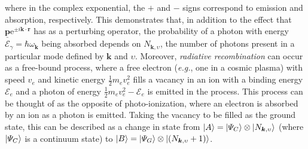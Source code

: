 where in the complex exponential, the $+$ and $-$ signs correspond to emission and absorption, respectively. 
This demonstrates that, in addition to the effect that $\underline{\mathbold{p}} \mathrm{e}^{\pm i \mathbold{k} \cdot \mathbold{r}}$ has as a perturbing operator, the probability of a photon with energy $\mathcal{E}_{\gamma} = \hbar \omega_{\mathbold{k}}$ being absorbed depends on $N_{\mathbold{k},\upsilon}$, the number of photons present in a particular mode defined by $\mathbold{k}$ and $\upsilon$. 
Moreover, \emph{radiative recombination} can occur as a free-bound process, where a free electron (\emph{e.g.}, one in a cosmic plasma) with speed $v_e$ and kinetic energy $\frac{1}{2} m_e v_e^2$ fills a vacancy in an ion with a binding energy $\mathcal{E}_e$ and a photon of energy $\frac{1}{2} m_e v_e^2 - \mathcal{E}_e$ is emitted in the process. 
This process can be thought of as the opposite of photo-ionization, where an electron is absorbed by an ion as a photon is emitted. 
Taking the vacancy to be filled as the ground state, this can be described as a change in state from $\ket{A} = \ket{\Psi_C} \otimes \ket{N_{\mathbold{k},\upsilon}}$ (where $\ket{\Psi_C}$ is a continuum state) to $\ket{B} = \ket{\Psi_G} \otimes \ket{\left( N_{\mathbold{k},\upsilon} + 1 \right)}$. 

